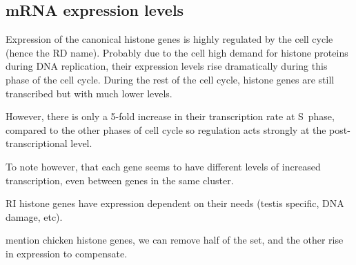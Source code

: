   \subsection{mRNA expression levels}
    Expression of the canonical histone genes is highly regulated by
    the cell cycle (hence the RD name). Probably due
    to the cell high demand for histone proteins during DNA replication, their expression levels rise dramatically
    during this phase of the cell cycle. During the rest of the cell cycle, histone genes are still transcribed
    but with much lower levels.

    However, there is only a 5-fold increase in their transcription rate at S~phase, compared to the other phases
    of cell cycle so regulation acts strongly at the post-transcriptional level\addref.

    To note however, that each gene seems to have different levels of increased transcription, even between genes in the
    same cluster.

    RI histone genes have expression dependent on their needs (testis specific, DNA damage, etc).

    mention chicken histone genes, we can remove half of the set, and the other rise in expression to compensate.


